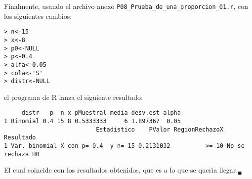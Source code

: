 \begin{solucion}
 Finalmente, usando el archivo anexo \texttt{P08\_Prueba\_de\_una\_proporcion\_01.r},
 con los siguientes cambios:
 \begin{verbatim}
> n<-15
> x<-8
> p0<-NULL
> p<-0.4
> alfa<-0.05
> cola<-'S'
> distr<-NULL
 \end{verbatim}
 \vspace{-0.5cm}
 el programa de R lanza el siguiente resultado:
 \begin{verbatim}
     distr   p  n x pMuestral media desv.est alpha
1 Binomial 0.4 15 8 0.5333333     6 1.897367  0.05
                          Estadistico    PValor RegionRechazoX        Resultado
1 Var. binomial X con p= 0.4  y n= 15 0.2131032          >= 10 No se rechaza H0  
 \end{verbatim}
 \vspace{-0.5cm}
 El cual coincide con los resultados obtenidos,
 que es a lo que se quer\'{\i}a llegar.${}_{\blacksquare}$
\end{solucion}
